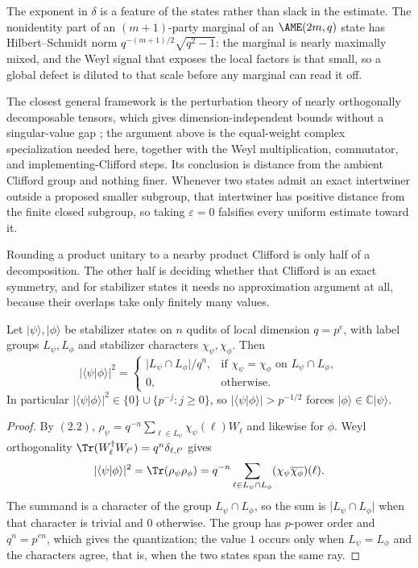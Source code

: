 The exponent in \(\delta\) is a feature of the states rather than slack in
the estimate.  The nonidentity part of an \((m+1)\)-party marginal of an
\(\AME(2m,q)\) state has Hilbert--Schmidt norm
\(q^{-(m+1)/2}\sqrt{q^2-1}\): the marginal is nearly maximally mixed, and
the Weyl signal that exposes the local factors is that small, so a global
defect is diluted to that scale before any marginal can read it off.

The closest general framework is the perturbation theory of nearly
orthogonally decomposable tensors, which gives dimension-independent bounds
without a singular-value gap \cite{AuddyYuan2020}; the argument above is
the equal-weight complex specialization needed here, together with the
Weyl multiplication, commutator, and implementing-Clifford steps.  Its
conclusion is distance from the ambient Clifford group and nothing finer.
Whenever two states admit an exact intertwiner outside a proposed smaller
subgroup, that intertwiner has positive distance from the finite closed
subgroup, so taking \(\varepsilon=0\) falsifies every uniform estimate
toward it.

Rounding a product unitary to a nearby product Clifford is only half of a
decomposition.  The other half is deciding whether that Clifford is an
exact symmetry, and for stabilizer states it needs no approximation
argument at all, because their overlaps take only finitely many values.

\begin{lemma}
\label{lem:stabilizer-overlap-gap}
Let \(\lvert\psi\rangle,\lvert\phi\rangle\) be stabilizer states on \(n\)
qudits of local dimension \(q=p^e\), with label groups \(L_\psi,L_\phi\)
and stabilizer characters \(\chi_\psi,\chi_\phi\).  Then
\[
 \lvert\langle\psi\vert\phi\rangle\rvert^2=
 \begin{cases}
  \lvert L_\psi\cap L_\phi\rvert/q^n,
   &\text{if \(\chi_\psi=\chi_\phi\) on \(L_\psi\cap L_\phi\)},\\
  0,&\text{otherwise.}
 \end{cases}
\]
In particular
\(\lvert\langle\psi\vert\phi\rangle\rvert^2\in\{0\}\cup\{p^{-j}:j\geq0\}\),
so \(\lvert\langle\psi\vert\phi\rangle\rvert>p^{-1/2}\) forces
\(\lvert\phi\rangle\in\mathbb C\lvert\psi\rangle\).
\end{lemma}

\begin{proof}
By \((2.2)\), \(\rho_\psi=q^{-n}\sum_{\ell\in L_\psi}\chi_\psi(\ell)W_\ell\)
and likewise for \(\phi\).  Weyl orthogonality
\(\Tr(W_\ell^\dagger W_{\ell'})=q^n\delta_{\ell,\ell'}\) gives
\[
 \lvert\langle\psi\vert\phi\rangle\rvert^2=\Tr(\rho_\psi\rho_\phi)
  =q^{-n}\sum_{\ell\in L_\psi\cap L_\phi}
    (\chi_\psi\overline{\chi_\phi})(\ell).
\]
The summand is a character of the group \(L_\psi\cap L_\phi\), so the sum
is \(\lvert L_\psi\cap L_\phi\rvert\) when that character is trivial and
\(0\) otherwise.  The group has \(p\)-power order and \(q^n=p^{en}\), which
gives the quantization; the value \(1\) occurs only when \(L_\psi=L_\phi\)
and the characters agree, that is, when the two states span the same ray.
\end{proof}

